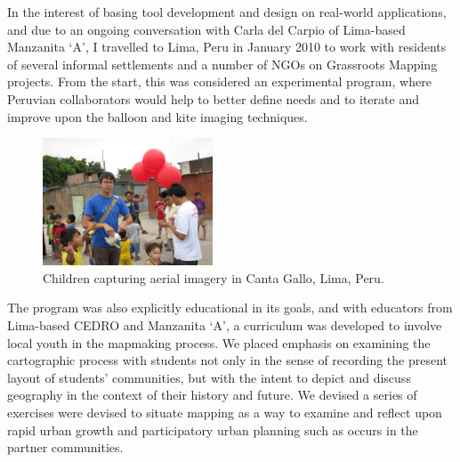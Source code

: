 \documentclass[11pt,oneside,notitlepage]{report}
\begin{document}
{{In the interest of basing tool development and design on real-world applications, and due to an ongoing conversation with Carla del Carpio of Lima-based Manzanita `A', I travelled to Lima, Peru in January 2010 to work with residents of several informal settlements and a number of NGOs on Grassroots Mapping projects. From the start, this was considered an experimental program, where Peruvian collaborators would help to better define needs and to iterate and improve upon the balloon and kite imaging techniques.

\begin{figure}
	\begin{flushright}
		\includegraphics[width=0.45\textwidth]{images/kids-canta-gallo.jpg}
		\caption{Children capturing aerial imagery in Canta Gallo, Lima, Peru.}
	\end{flushright}
\end{figure}

The program was also explicitly educational in its goals, and with educators from Lima-based \ac{CEDRO} and Manzanita `A', a curriculum was developed to involve local youth in the mapmaking process. We placed emphasis on examining the cartographic process with students not only in the sense of recording the present layout of students' communities, but with the intent to depict and discuss geography in the context of their history and future. We devised a series of exercises were devised to situate mapping as a way to examine and reflect upon rapid urban growth and participatory urban planning such as occurs in the partner communities.

}}
\end{document}
